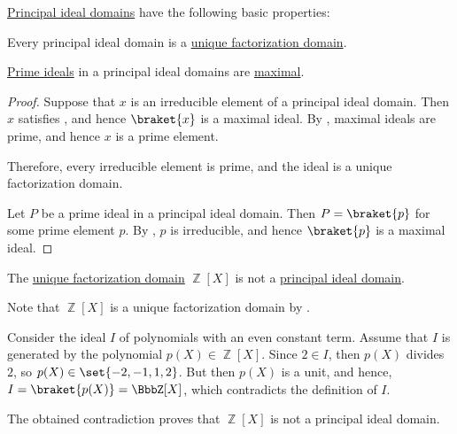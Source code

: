 \begin{proposition}\label{thm:def:principal_ideal_domain/properties}
  \hyperref[def:principal_ideal_domain]{Principal ideal domains} have the following basic properties:
  \begin{thmenum}
     Every principal ideal domain is a \hyperref[def:unique_factorization_domain]{unique factorization domain}.

     \hyperref[def:semiring_ideal/prime]{Prime ideals} in a principal ideal domains are \hyperref[def:semiring_ideal/maximal]{maximal}.
  \end{thmenum}
\end{proposition}
\begin{proof}
   Suppose that \( x \) is an irreducible element of a principal ideal domain. Then \( x \) satisfies , and hence \( \braket{ x } \) is a maximal ideal. By , maximal ideals are prime, and hence \( x \) is a prime element.

  Therefore, every irreducible element is prime, and the ideal is a unique factorization domain.

   Let \( P \) be a prime ideal in a principal ideal domain. Then \( P = \braket{ p } \) for some prime element \( p \). By , \( p \) is irreducible, and hence \( \braket{ p } \) is a maximal ideal.
\end{proof}

\begin{example}\label{thm:ufd_is_not_pid}
  The \hyperref[def:unique_factorization_domain]{unique factorization domain} \( \BbbZ[X] \) is not a \hyperref[def:principal_ideal_domain]{principal ideal domain}.

  Note that \( \BbbZ[X] \) is a unique factorization domain by .

  Consider the ideal \( I \) of polynomials with an even constant term. Assume that \( I \) is generated by the polynomial \( p(X) \in \BbbZ[X] \). Since \( 2 \in I \), then \( p(X) \) divides \( 2 \), so \( p(X) \in \set{ -2, -1, 1, 2 } \). But then \( p(X) \) is a unit, and hence, \( I = \braket{p(X)} = \BbbZ[X] \), which contradicts the definition of \( I \).

  The obtained contradiction proves that \( \BbbZ[X] \) is not a principal ideal domain.
\end{example}

